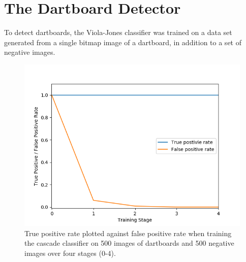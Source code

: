 \documentclass[conference]{IEEEtran}
\begin{document}
\section{The Dartboard Detector}
To detect dartboards, the Viola-Jones classifier was trained on a data set generated from a single bitmap image of a dartboard, in addition to a set of negative images. 
\begin{figure}[htbp]
\begin{center}
\includegraphics[width=1\linewidth]{images/TPRvsFPR}
\caption{True positive rate plotted against false positive rate when training the cascade classifier on 500 images of dartboards and 500 negative images over four stages (0-4). }
\label{default}
\end{center}
\end{figure}
\par
\end{document}
